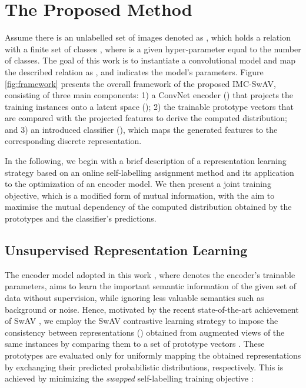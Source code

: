 \documentclass[journal]{IEEEtran}
\begin{document}
\section{The Proposed Method}
\label{sec:method}
Assume there is an unlabelled set of images denoted as , which holds a relation with a finite set of classes , where  is a given hyper-parameter equal to the number of classes. The goal of this work is to instantiate a convolutional model and map the described relation as , and  indicates the model's parameters. Figure \ref{fig:framework} presents the overall framework of the proposed IMC-SwAV, consisting of three main components: 1) a ConvNet encoder () that projects the training instances onto a latent space (); 2) the trainable prototype vectors  that are compared with the projected features to derive the computed distribution; and 3) an introduced classifier (), which maps the generated features to the corresponding discrete representation.

In the following, we begin with a brief description of a representation learning strategy based on an online self-labelling assignment method and its application to the optimization of an encoder model. We then present a joint training objective, which is a modified form of mutual information, with the aim to maximise the mutual dependency of the computed distribution obtained by the prototypes and the classifier's predictions.



\subsection{Unsupervised Representation Learning}

The encoder model adopted in this work , where  denotes the encoder's trainable parameters, aims to learn the important semantic information of the given set of data without supervision, while ignoring less valuable semantics such as background or noise. Hence, motivated by the recent state-of-the-art achievement of SwAV \cite{caron2020unsupervised}, we employ the SwAV contrastive learning strategy to impose the consistency between representations () obtained from augmented views of the same instances by comparing them to a set of prototype vectors . These prototypes are evaluated only for uniformly mapping the obtained representations by exchanging their predicted probabilistic distributions, respectively. This is achieved by minimizing the \textit{swapped} self-labelling training objective \cite{caron2020unsupervised}: 
\end{document}
